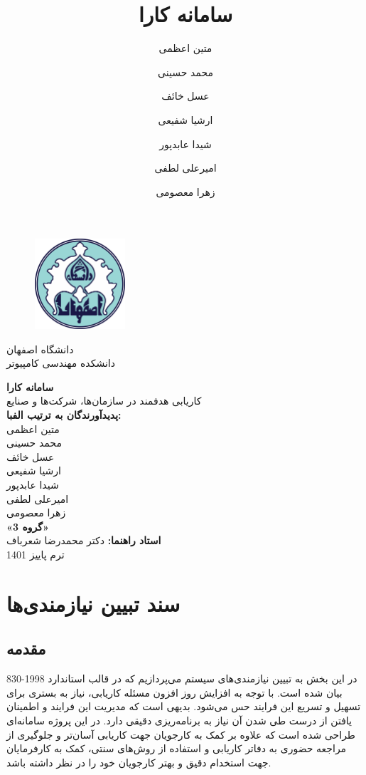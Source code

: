 \documentclass[12pt]{article}
\author{متین اعظمی}
\author{محمد حسینی}
\author{عسل خائف}
\author{ارشیا شفیعی}
\author{شیدا عابدپور}
\author{امیرعلی لطفی}
\author{زهرا معصومی}
\title{سامانه کارا}
\begin{document}
	\begin{figure}
		\centering
		\includegraphics[width=0.3\textwidth]{files/logo}
	\end{figure}
	\begin{center}
		دانشگاه اصفهان\\
		دانشکده مهندسی کامپیوتر
		\vspace{2\baselineskip}

		{\Huge \textbf{سامانه کارا}}\\

		\vspace{1\baselineskip}
		کاریابی هدفمند در سازمان‌ها، شرکت‌ها و صنایع\\

		\vspace{2\baselineskip}
		\textbf{پدیدآورندگان به ترتیب الفبا:}\\
		متین اعظمی\\
		محمد حسینی\\
		عسل خائف\\
		ارشیا شفیعی\\
		شیدا عابدپور\\
		امیرعلی لطفی\\
		زهرا معصومی\\
		\vspace{2\baselineskip}
		\textbf{«گروه 3»}\\
		\vspace{3\baselineskip}
		{\textbf{استاد راهنما:}}
		دکتر محمدرضا شعرباف\\
		\vspace{3\baselineskip}
		ترم پاییز 1401

	\end{center}

	\newpage
	\tableofcontents
	\listoftables
	\listoffigures
	\newpage

	\section{سند تبیین نیازمندی‌ها}

	\subsection{مقدمه}
	در این بخش به تبیین نیازمندی‌های سیستم می‌پردازیم که در قالب استاندارد 1998-830
	\textbf{}
	بیان شده است.
	با توجه به افزایش روز افزون مسئله کاریابی، نیاز به بستری برای تسهیل و تسریع این فرایند حس می‌شود. بدیهی است که مدیریت این فرایند و اطمینان یافتن از درست طی شدن آن نیاز به برنامه‌ریزی دقیقی دارد.
	در این پروژه سامانه‌ای طراحی شده است که علاوه بر کمک به کارجویان جهت کاریابی آسان‌تر و جلوگیری از مراجعه حضوری به دفاتر کاریابی و استفاده از روش‌های سنتی، کمک به کارفرمایان جهت استخدام دقیق و بهتر کارجویان خود را در نظر داشته باشد.
\end{document}
